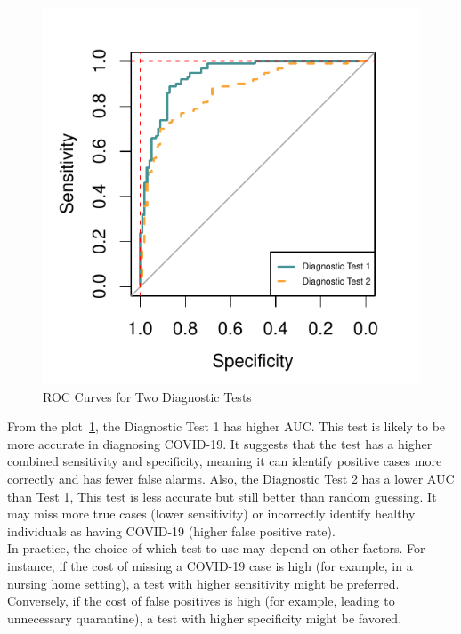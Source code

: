 \documentclass{article}\usepackage[]{graphicx}\usepackage[]{xcolor}
\makeatletter
\def\maxwidth{ %
  \ifdim\Gin@nat@width>\linewidth
    \linewidth
  \else
    \Gin@nat@width
  \fi
}
\newenvironment{knitrout}{}{} %
\numberwithin{equation}{section}
\makeatother
\begin{document}
\begin{knitrout}
\begin{figure}[H]
{\centering \includegraphics[width=\maxwidth]{figure/beamer-roc-1} 

}

\caption[ROC Curves for Two Diagnostic Tests]{ROC Curves for Two Diagnostic Tests}\label{fig:roc}
\end{figure}

\end{knitrout}

\noindent
From the plot~\ref{fig:roc}, the Diagnostic Test 1 has higher AUC. This test is likely to be more accurate in diagnosing COVID-19. It suggests that the test has a higher combined sensitivity and specificity, meaning it can identify positive cases more correctly and has fewer false alarms. Also, the Diagnostic Test 2 has a lower AUC than Test 1, This test is less accurate but still better than random guessing. It may miss more true cases (lower sensitivity) or incorrectly identify healthy individuals as having COVID-19 (higher false positive rate).\\

\noindent
In practice, the choice of which test to use may depend on other factors. For instance, if the cost of missing a COVID-19 case is high (for example, in a nursing home setting), a test with higher sensitivity might be preferred. Conversely, if the cost of false positives is high (for example, leading to unnecessary quarantine), a test with higher specificity might be favored.
\end{document}
